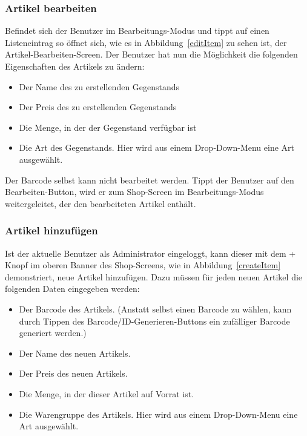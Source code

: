 \subsubsection{Artikel bearbeiten} \label{subsubsec:shop-edit-items}

Befindet sich der Benutzer im Bearbeitungs-Modus und tippt auf einen Listeneintrag so öffnet sich, wie es in Abbildung~\ref{editItem} zu sehen ist, der Artikel-Bearbeiten-Screen.
Der Benutzer hat nun die Möglichkeit die folgenden Eigenschaften des Artikels zu ändern:

\begin{itemize}
	\item Der Name des zu erstellenden Gegenstands

	\item Der Preis des zu erstellenden Gegenstands

	\item Die Menge, in der der Gegenstand verfügbar ist

	\item Die Art des Gegenstands.
	Hier wird aus einem Drop-Down-Menu eine Art ausgewählt.
\end{itemize}

Der Barcode selbst kann nicht bearbeitet werden.
Tippt der Benutzer auf den Bearbeiten-Button, wird er zum Shop-Screen im Bearbeitungs-Modus weitergeleitet, der den bearbeiteten Artikel enthält.


\subsubsection{Artikel hinzufügen} \label{subsubsec:shop-add-items}

Ist der aktuelle Benutzer als Administrator eingeloggt, kann dieser mit dem + Knopf im oberen Banner des Shop-Screens, wie in Abbildung~\ref{createItem} demonstriert, neue Artikel hinzufügen.
Dazu müssen für jeden neuen Artikel die folgenden Daten eingegeben werden:

\begin{itemize}
	\item Der Barcode des Artikels. (Anstatt selbst einen Barcode zu wählen, kann durch Tippen des Barcode/ID-Generieren-Buttons ein zufälliger Barcode generiert werden.)

	\item Der Name des neuen Artikels.

	\item Der Preis des neuen Artikels.

	\item Die Menge, in der dieser Artikel auf Vorrat ist.

	\item Die Warengruppe des Artikels.
	Hier wird aus einem Drop-Down-Menu eine Art ausgewählt.
\end{itemize}

